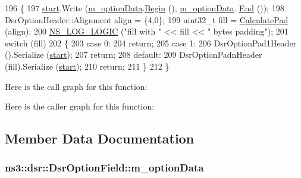 \begin{DoxyCode}
196 \{
197   \hyperlink{namespacevisualizer_1_1core_a2a35e5d8a34af358b508dac8635754e0}{start}.Write (\hyperlink{classns3_1_1dsr_1_1DsrOptionField_a5394f79d96673471bcf222ed47beb26d}{m\_optionData}.\hyperlink{classns3_1_1Buffer_a893d4bf50df13e730b6cd0fda91b967f}{Begin} (), \hyperlink{classns3_1_1dsr_1_1DsrOptionField_a5394f79d96673471bcf222ed47beb26d}{m\_optionData}.
      \hyperlink{classns3_1_1Buffer_a52207c7aed7bae89fba2f9e997c82724}{End} ());
198   DsrOptionHeader::Alignment align = \{4,0\};
199   uint32\_t fill = \hyperlink{classns3_1_1dsr_1_1DsrOptionField_a83b979a52f0e70889f34e58ea5398433}{CalculatePad} (align);
200   \hyperlink{group__logging_ga88acd260151caf2db9c0fc84997f45ce}{NS\_LOG\_LOGIC} (\textcolor{stringliteral}{"fill with "} << fill << \textcolor{stringliteral}{" bytes padding"});
201   \textcolor{keywordflow}{switch} (fill)
202     \{
203     \textcolor{keywordflow}{case} 0:
204       \textcolor{keywordflow}{return};
205     \textcolor{keywordflow}{case} 1:
206       DsrOptionPad1Header ().Serialize (\hyperlink{namespacevisualizer_1_1core_a2a35e5d8a34af358b508dac8635754e0}{start});
207       \textcolor{keywordflow}{return};
208     \textcolor{keywordflow}{default}:
209       DsrOptionPadnHeader (fill).Serialize (\hyperlink{namespacevisualizer_1_1core_a2a35e5d8a34af358b508dac8635754e0}{start});
210       \textcolor{keywordflow}{return};
211     \}
212 \}
\end{DoxyCode}


Here is the call graph for this function\+:




Here is the caller graph for this function\+:




\subsection{Member Data Documentation}
\subsubsection[{\texorpdfstring{m\+\_\+option\+Data}{m_optionData}}]{ ns3\+::dsr\+::\+Dsr\+Option\+Field\+::m\+\_\+option\+Data\hspace{0.3cm}{\ttfamily [private]}}\hypertarget{classns3_1_1dsr_1_1DsrOptionField_a5394f79d96673471bcf222ed47beb26d}{}\label{classns3_1_1dsr_1_1DsrOptionField_a5394f79d96673471bcf222ed47beb26d}


